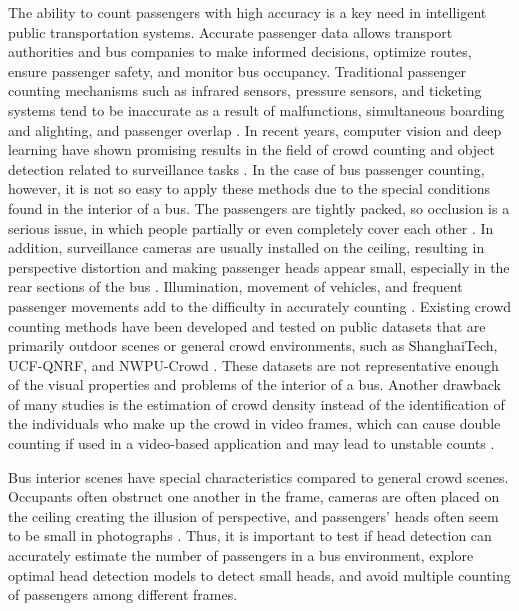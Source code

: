 \documentclass[12pt,a4paper]{report}
\begin{document}
The ability to count passengers with high accuracy is a key need in intelligent public transportation systems. Accurate passenger data allows transport authorities and bus companies to make informed decisions, optimize routes, ensure passenger safety, and monitor bus occupancy. Traditional passenger counting mechanisms such as infrared sensors, pressure sensors, and ticketing systems tend to be inaccurate as a result of malfunctions, simultaneous boarding and alighting, and passenger overlap \cite{Aleksander2024}. In recent years, computer vision and deep learning have shown promising results in the field of crowd counting and object detection related to surveillance tasks \cite{sindagi2022survey}. In the case of bus passenger counting, however, it is not so easy to apply these methods due to the special conditions found in the interior of a bus. The passengers are tightly packed, so occlusion is a serious issue, in which people partially or even completely cover each other \cite{sundararaman2021}. In addition, surveillance cameras are usually installed on the ceiling, resulting in perspective distortion and making passenger heads appear small, especially in the rear sections of the bus \cite{rapid2020}. Illumination, movement of vehicles, and frequent passenger movements add to the difficulty in accurately counting \cite{Claire2021}. Existing crowd counting methods have been developed and tested on public datasets that are primarily outdoor scenes or general crowd environments, such as ShanghaiTech, UCF-QNRF, and NWPU-Crowd \cite{wang2020nwpu}. These datasets are not representative enough of the visual properties and problems of the interior of a bus. Another drawback of many studies is the estimation of crowd density instead of the identification of the individuals who make up the crowd in video frames, which can cause double counting if used in a video-based application and may lead to unstable counts \cite{hassan2023crowd}.


Bus interior scenes have special characteristics compared to general crowd scenes. Occupants often obstruct one another in the frame, cameras are often placed on the ceiling creating the illusion of perspective, and passengers' heads often seem to be small in photographs \cite{tezcan2024fisheye}. Thus, it is important to test if head detection can accurately estimate the number of passengers in a bus environment, explore optimal head detection models to detect small heads, and avoid multiple counting of passengers among different frames.
\end{document}
